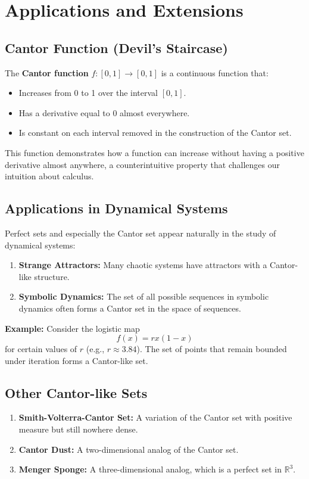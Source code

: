 \documentclass{article}
\begin{document}
\section{Applications and Extensions}

\subsection{Cantor Function (Devil's Staircase)}

The \textbf{Cantor function} $f:[0,1] \rightarrow [0,1]$ is a continuous function that:
\begin{itemize}
    \item Increases from 0 to 1 over the interval $[0,1]$.
    \item Has a derivative equal to 0 almost everywhere.
    \item Is constant on each interval removed in the construction of the Cantor set.
\end{itemize}
This function demonstrates how a function can increase without having a positive derivative almost anywhere, a counterintuitive property that challenges our intuition about calculus.

\subsection{Applications in Dynamical Systems}

Perfect sets and especially the Cantor set appear naturally in the study of dynamical systems:
\begin{enumerate}
    \item \textbf{Strange Attractors:} Many chaotic systems have attractors with a Cantor-like structure.
    \item \textbf{Symbolic Dynamics:} The set of all possible sequences in symbolic dynamics often forms a Cantor set in the space of sequences.
\end{enumerate}

\textbf{Example:} Consider the logistic map 
\[
f(x) = rx(1-x)
\]
for certain values of $r$ (e.g., $r \approx 3.84$). The set of points that remain bounded under iteration forms a Cantor-like set.

\subsection{Other Cantor-like Sets}

\begin{enumerate}
    \item \textbf{Smith-Volterra-Cantor Set:} A variation of the Cantor set with positive measure but still nowhere dense.
    \item \textbf{Cantor Dust:} A two-dimensional analog of the Cantor set.
    \item \textbf{Menger Sponge:} A three-dimensional analog, which is a perfect set in $\mathbb{R}^3$.
\end{enumerate}
\end{document}
